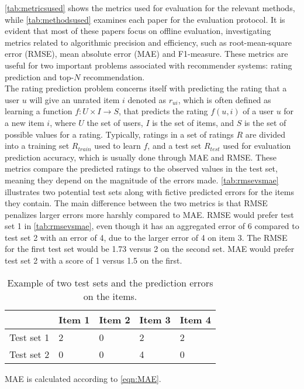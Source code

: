 \autoref{tab:metricsused} shows the metrics used for evaluation for the relevant methods, while \autoref{tab:methodsused} examines each paper for the evaluation protocol.
It is evident that most of these papers focus on offline evaluation, investigating metrics related to algorithmic precision and efficiency, such as root-mean-square error (RMSE), mean absolute error (MAE) and F1-measure.
These metrics are useful for two important problems associated with recommender systems: rating prediction and top-$N$ recommendation\cite{RecommenderHandbook2015}.
\\
The rating prediction problem concerns itself with predicting the rating that a user $u$ will give an unrated item $i$ denoted as $r_{ui}$, which is often defined as learning a function $f : U \times I \rightarrow S$, that predicts the rating $f(u, i)$ of a user $u$ for a new item $i$, where $U$ the set of users, $I$ is the set of items, and $S$ is the set of possible values for a rating.
Typically, ratings in a set of ratings $R$ are divided into a training set $R_{train}$ used to learn $f$, and a test set $R_{test}$ used for evaluation prediction accuracy, which is usually done through MAE and RMSE.
These metrics compare the predicted ratings to the observed values in the test set, meaning they depend on the magnitude of the errors made.
\autoref{tab:rmsevsmae} illustrates two potential test sets along with fictive predicted errors for the items they contain.
The main difference between the two metrics is that RMSE penalizes larger errors more harshly compared to MAE.
RMSE would prefer test set 1 in \autoref{tab:rmsevsmae}, even though it has an aggregated error of 6 compared to test set 2 with an error of 4, due to the larger error of 4 on item 3.
The RMSE for the first test set would be 1.73 versus 2 on the second set.
MAE would prefer test set 2 with a score of 1 versus 1.5 on the first.
\begin{table}[]
    \begin{tabular}{|l|l|l|l|l|}
    \hline
               & Item 1 & Item 2 & Item 3 & Item 4 \\ \hline
    Test set 1 & 2      & 0      & 2      & 2      \\ \hline
    Test set 2 & 0      & 0      & 4      & 0      \\ \hline
    \end{tabular}
    \caption{Example of two test sets and the prediction errors on the items.}
    \label{tab:rmsevsmae}
\end{table}
MAE is calculated according to \autoref{eqn:MAE}.
